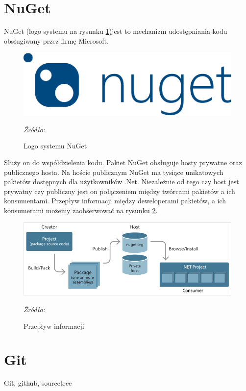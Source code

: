 \documentclass[12pt,twoside]{report}
\begin{document}
\section{NuGet}
NuGet (logo systemu na rysunku \ref{nugetLogo})jest to mechanizm udostępniania kodu obsługiwany przez firmę Microsoft. 
\begin{figure}[H]
	\centering
	\includegraphics[scale=0.25]{nugetLogo}
	\caption{Logo systemu NuGet}
	\textit{Źródło: \cite{Nuget}}
	\label{nugetLogo}
\end{figure}
Służy on do współdzielenia kodu. Pakiet NuGet obsługuje hosty prywatne oraz publicznego hosta. Na hoście publicznym NuGet ma tysiące unikatowych pakietów dostępnych dla użytkowników .Net. Niezależnie od tego czy host jest prywatny czy publiczny jest on połączeniem między twórcami pakietów a ich konsumentami. Przepływ informacji między deweloperami pakietów, a ich konsumerami możemy zaobserwować na rysunku \ref{NugetFlow}.
\begin{figure}[H]
	\centering
	\includegraphics[scale=0.75]{nugetFlow}
	\caption{Przepływ informacji}
	\textit{Źródło: \cite{Nuget}}
	\label{NugetFlow}
\end{figure}
\section{Git}
Git, github, sourcetree
\end{document}
